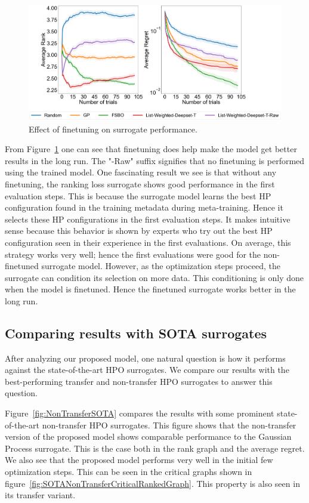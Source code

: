 \documentclass[12pt, twoside, ngerman]{report}
\begin{document}
\begin{figure}[h]
  \centering
    \includegraphics[scale=0.25]{images/FineTuningAblation}
    \caption{Effect of finetuning on surrogate performance.}
    \label{fig:FineTuningAblation}
\end{figure}

From Figure~\ref{fig:FineTuningAblation} one can see that finetuning does help make the model get better results in the long run.
The "-Raw" suffix signifies that no finetuning is performed using the trained model.
One fascinating result we see is that without any finetuning, the ranking loss surrogate shows good performance in the first evaluation steps.
This is because the surrogate model learns the best HP configuration found in the training metadata during meta-training.
Hence it selects these HP configurations in the first evaluation steps.
It makes intuitive sense because this behavior is shown by experts who try out the best HP configuration seen in their experience in the first evaluations. On average, this strategy works very well; hence the first evaluations were good for the non-finetuned surrogate model.
However, as the optimization steps proceed, the surrogate can condition its selection on more data. This conditioning is only done when the model is finetuned. Hence the finetuned surrogate works better in the long run.

\subsection{Comparing results with SOTA surrogates}
After analyzing our proposed model, one natural question is how it performs against the state-of-the-art HPO surrogates. We compare our results with the best-performing transfer and non-transfer HPO surrogates to answer this question.

Figure~\ref{fig:NonTransferSOTA} compares the results with some prominent state-of-the-art non-transfer HPO surrogates. This figure shows that the non-transfer version of the proposed model shows comparable performance to the Gaussian Process surrogate. This is the case both in the rank graph and the average regret. We also see that the proposed model performs very well in the initial few optimization steps. This can be seen in the critical graphs shown in figure~\ref{fig:SOTANonTransferCriticalRankedGraph}. This property is also seen in its transfer variant.
\end{document}
